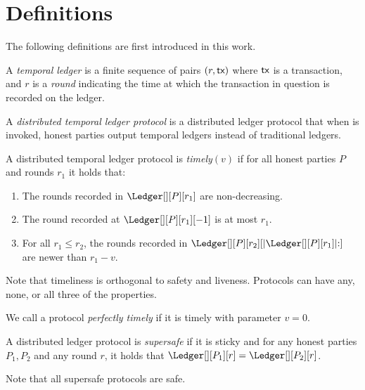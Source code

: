 \section{Definitions}

The following definitions are first introduced in this work.

\begin{definition}
  A \emph{temporal ledger} is a finite sequence of pairs $(r, \textsf{tx})$ where $\textsf{tx}$ is
  a transaction, and $r$ is a \emph{round} indicating the time at which
  the transaction in question is recorded on the ledger.
\end{definition}

\begin{definition}
  A \emph{distributed temporal ledger protocol} is a distributed ledger protocol
  that when \rread is invoked, honest parties output temporal ledgers instead of traditional ledgers.
\end{definition}

\begin{definition}[Timely]\label{def:timely}
  A distributed temporal ledger protocol is \emph{timely}$(v)$
  if for all honest parties $P$ and rounds $r_1$ it holds that:

  \begin{enumerate}
    \item The rounds recorded in $\Ledger[][P][r_1]$ are non-decreasing.\label{def:timely-increasing}
    \item The round recorded at $\Ledger[][P][r_1][-1]$ is at most $r_1$.\label{def:timely-past}
    \item For all $r_1 \leq r_2$, the rounds recorded in $\Ledger[][P][r_2][|\Ledger[][P][r_1]|{:}]$ are
          newer than $r_1 - v$.\label{def:timely-chunk}
  \end{enumerate}
\end{definition}

Note that timeliness is orthogonal to safety and liveness. Protocols can have any, none, or all three
of the properties.

\begin{definition}
  We call a protocol \emph{perfectly timely} if it is timely with parameter $v = 0$.
\end{definition}

\begin{definition}[Supersafety]
  A distributed ledger protocol is \emph{supersafe} if it is sticky and
  for any honest parties $P_1, P_2$ and any round $r$, it holds that
  $\Ledger[][P_1][r] = \Ledger[][P_2][r]$.
\end{definition}

Note that all supersafe protocols are safe.
